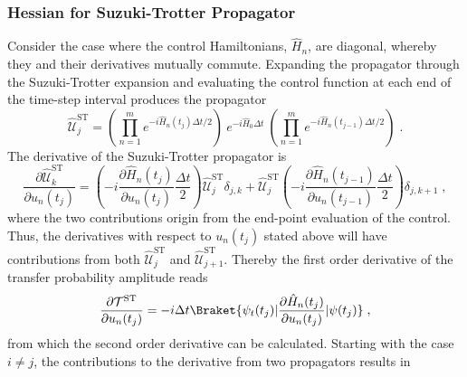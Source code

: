 \subsubsection{Hessian for Suzuki-Trotter Propagator}
Consider the case where the control Hamiltonians, $\hat{H}_n$, are diagonal, whereby they and their derivatives mutually commute. Expanding the propagator through the Suzuki-Trotter expansion and evaluating the control function at each end of the time-step interval produces the propagator 
\begin{equation}
	\hat{\mathcal{U}}_{j}^{\mathrm{ST}} = \left( \prod_{n = 1}^{m} e^{ -i \hat{H}_n (t_j) \Delta t /2 } \right) \: e^{ -i \hat{H}_0 \Delta t } \: \left( \prod_{n = 1}^{m} e^{  -i  \hat{H}_n  (t_{j-1})  \Delta t /2 } \right) \; .
\end{equation}
The derivative of the Suzuki-Trotter propagator is
\begin{equation}
	\frac{\partial \hat{\mathcal{U}}_{k}^{\mathrm{ST}}}{\partial u_n (t_j)} = \left( -i \frac{\partial \hat{H}_n (t_j)}{\partial u_n (t_j)} \frac{\Delta t}{2} \right) \hat{\mathcal{U}}_{j}^{\mathrm{ST}} \delta_{j , k} + \hat{\mathcal{U}}_{j}^{\mathrm{ST}} \left( -i \frac{\partial \hat{H}_n (t_{j-1})}{\partial u_n (t_{j-1})} \frac{\Delta t}{2} \right)  \delta_{j , k+1} \; ,
\end{equation}
where the two contributions origin from the end-point evaluation of the control. Thus, the derivatives with respect to $u_n (t_j)$ stated above will have contributions from both $\hat{\mathcal{U}}_{j}^{\mathrm{ST}}$ and $\hat{\mathcal{U}}_{j+1}^{\mathrm{ST}}$. Thereby the first order derivative of the transfer probability amplitude reads 
\begin{equation}
	\frac{\partial \mathcal{T}^{\mathrm{ST}}}{\partial u_n (t_j)} = -i \Delta t \Braket{\psi_t (t_j) | \frac{\partial \hat{H}_n (t_j)}{\partial u_n (t_j)} | \psi (t_j) } \; ,
\end{equation}
from which the second order derivative can be calculated. Starting with the case $i \neq j$, the contributions to the derivative from two propagators results in
